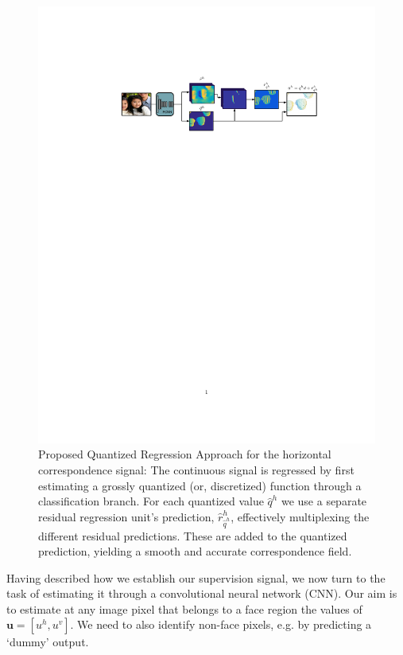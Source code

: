 
\begin{figure}[t]
    \centering
    \includegraphics[trim={5.2cm 20cm 3.7cm 4.5cm}, clip, width=0.95\linewidth ]{resources/Human_Poses/Flow}
    \caption{Proposed Quantized Regression Approach for the horizontal correspondence signal: The continuous  signal is regressed by first estimating a grossly quantized (or, discretized) function  through a classification branch. For each quantized value $\hat{q}^h$ we use a separate residual regression unit's prediction, $\hat{r}^h_{\hat{q}^h}$, effectively multiplexing the different residual predictions. These are added to the quantized prediction, yielding a smooth and accurate correspondence field. }
    \label{fig:Pipeline}
\end{figure}


Having described how we establish our supervision signal, we now turn to the task of estimating it through a convolutional neural network (CNN). 
Our aim is to estimate at any image pixel that belongs to a face region the values of  $\bm{u} =[u^h, u^v]$. We need to also identify non-face pixels,  e.g. by predicting a `dummy' output. 

